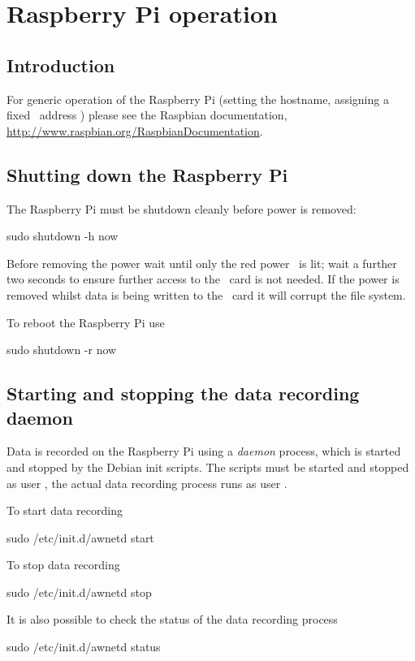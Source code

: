 \chapter{Raspberry Pi operation}

\section{Introduction}

For generic operation of the Raspberry Pi (setting the hostname,
assigning a fixed \ip\ address \etc) please see the Raspbian
documentation,
\url{http://www.raspbian.org/RaspbianDocumentation}.

\section{Shutting down the Raspberry Pi}

The Raspberry Pi must be shutdown cleanly before power is removed:
\begin{Cmd}
sudo shutdown -h now
\end{Cmd}
Before removing the power wait until only the red power \led\ is lit;
wait a further two seconds to ensure further access to the \sd\ card is
not needed. If the power is removed whilst data is being written to
the \sd\ card it will corrupt the file system.


To reboot the Raspberry Pi use
\begin{Cmd}
sudo shutdown -r now
\end{Cmd}

\section{Starting and stopping the data recording daemon}

Data is recorded on the Raspberry Pi using a \emph{daemon} process,
which is started and stopped by the Debian init scripts. The scripts
must be started and stopped as user \rootUser, the actual data
recording process runs as user \piUser.

To start data recording
\begin{Cmd}
sudo /etc/init.d/awnetd start
\end{Cmd}

To stop data recording
\begin{Cmd}
sudo /etc/init.d/awnetd stop
\end{Cmd}

It is also possible to check the status of the data recording process
\begin{Cmd}
sudo /etc/init.d/awnetd status
\end{Cmd}


